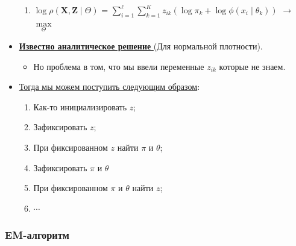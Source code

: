 \begin{itemize}
\begin{enumerate}
                    \item \begin{center}
                        \Large
                        $\log \rho(\mathbf{X}, \mathbf{Z} \mid \Theta)$ = $\sum_{i = 1}^\ell \sum\limits_{k = 1}^K z_{ik}(\log \pi_k + \log \phi(x_i \mid \theta_k))$ $\longrightarrow$ $\max\limits_{\Theta}$
                    \end{center}
                    
                \end{enumerate}
                

                \item \underline{\textbf{Известно аналитическое решение }} (Для нормальной плотности).
                \begin{itemize}
                    \item Но проблема в том, что мы ввели переменные $z_{ik}$ которые не знаем.
                \end{itemize}

                \item \underline{Тогда мы можем поступить следующим образом}:
                \begin{enumerate}
                    \item Как-то инициализировать $z$;
                    
                    \item Зафиксировать $z$;
                    
                    \item При фиксированном $z$ найти $\pi$ и $\theta$;

                    \item Зафиксировать $\pi$ и $\theta$

                    \item При фиксированном $\pi$ и $\theta$ найти $z$;

                    \item $\cdots$
                    
                \end{enumerate}

            \end{itemize}


    \subsubsection{EM-алгоритм}

